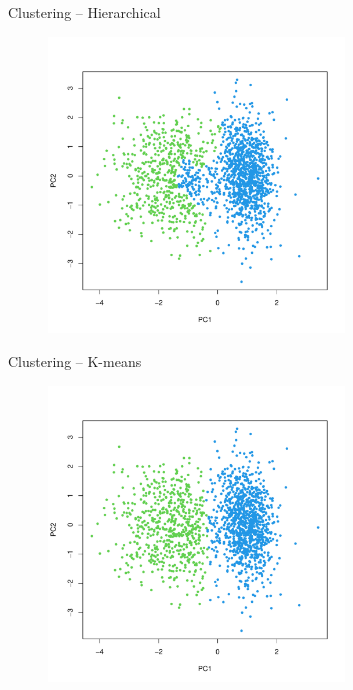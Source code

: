 \documentclass{beamer}
\begin{document}
\begin{frame}{Clustering -- Hierarchical}
  \begin{figure}
    \begin{center}
      \includegraphics[width=0.7\textwidth]{hclust_pca.pdf}
    \end{center}
  \end{figure}
\end{frame}

\begin{frame}{Clustering -- K-means}
  \begin{figure}
    \begin{center}
      \includegraphics[width=0.7\textwidth]{knn_pca.pdf}
    \end{center}
  \end{figure}
\end{frame}
\end{document}
